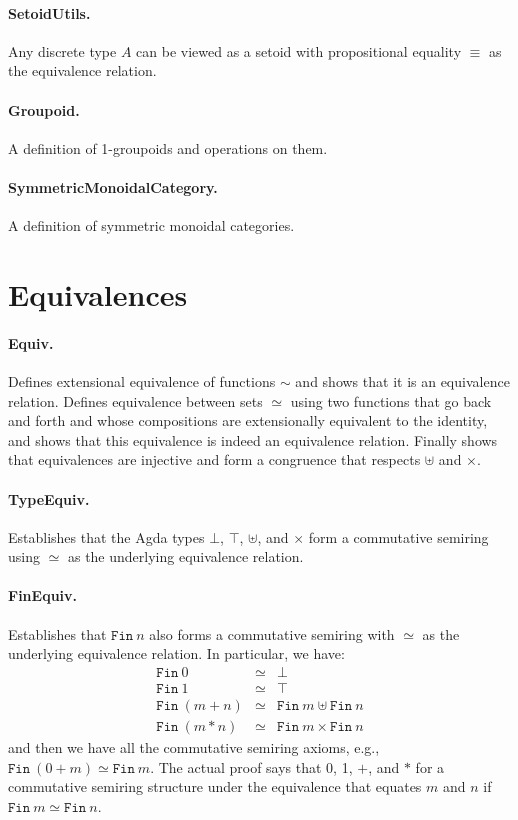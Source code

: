\documentclass{article}
\begin{document}
\paragraph*{SetoidUtils.} Any discrete type $A$ can be viewed as a
setoid with propositional equality $\equiv$ as the equivalence
relation.

\paragraph*{Groupoid.} A definition of 1-groupoids and operations on 
them. 

\paragraph*{SymmetricMonoidalCategory.} A definition of symmetric
monoidal categories.

\section{Equivalences} 

\paragraph*{Equiv.} Defines extensional equivalence of functions
$\sim$ and shows that it is an equivalence relation. Defines
equivalence between sets $\simeq$ using two functions that go back and
forth and whose compositions are extensionally equivalent to the
identity, and shows that this equivalence is indeed an equivalence
relation. Finally shows that equivalences are injective and form a
congruence that respects $\uplus$ and $\times$. 

\paragraph*{TypeEquiv.} Establishes that the Agda types $\bot$,
$\top$, $\uplus$, and $\times$ form a commutative semiring using
$\simeq$ as the underlying equivalence relation.

\paragraph*{FinEquiv.} Establishes that $\texttt{Fin}~n$ also forms a
commutative semiring with $\simeq$ as the underlying equivalence
relation. In particular, we have:
\[\begin{array}{rcll}
\texttt{Fin}~0 &\simeq& \bot \\
\texttt{Fin}~1 &\simeq& \top \\
\texttt{Fin}~(m+n) &\simeq& \texttt{Fin}~m \uplus \texttt{Fin}~n \\
\texttt{Fin}~(m*n) &\simeq& \texttt{Fin}~m \times \texttt{Fin}~n
\end{array}\]
and then we have all the commutative semiring axioms, e.g.,
$\texttt{Fin}~(0+m) \simeq \texttt{Fin}~m$. The actual proof says that
0, 1, $+$, and $*$ for a commutative semiring structure under the
equivalence that equates $m$ and $n$ if
$\texttt{Fin}~m \simeq \texttt{Fin}~n$.
\end{document}
